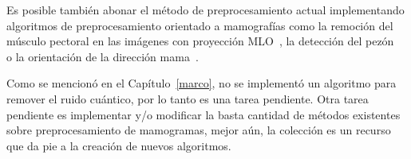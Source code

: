 Es posible también abonar el método de preprocesamiento actual implementando
algoritmos de preprocesamiento orientado a mamografías como la remoción del
músculo pectoral en las imágenes con proyección MLO~\cite{raba2005breast}, la
detección del pezón~\cite{mendez1996automatic} o la orientación de la dirección
mama~\cite{masek2003automatic}.

Como se mencionó en el Capítulo~\ref{marco}, no se implementó un algoritmo para
remover el ruido cuántico, por lo tanto es una tarea pendiente. Otra tarea
pendiente es implementar y/o modificar la basta cantidad de métodos existentes
sobre preprocesamiento de mamogramas, mejor aún, la colección es un recurso que
da pie a la creación de nuevos algoritmos.

